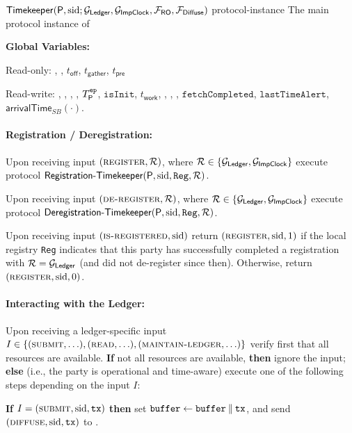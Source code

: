 \begin{cccProtocol}
    {$\mathsf{Timekeeper}(\mathsf{P}, \mathrm{sid}; \mathcal{G}_{\textsf{Ledger}}, \mathcal{G}_{\mathsf{ImpClock}}, \mathcal{F}_{\mathsf{RO}}, \mathcal{F}_{\mathsf{Diffuse}})$}
    {protocol-instance}
    {The main protocol instance of \timekeeper}

    \noindent\textbf{Global Variables:}
    \begin{cccItemize}[nosep]
        \item Read-only: \syncLen, \diffLen, $t_{\mathsf{off}}$, $t_{\mathsf{gather}}$, $t_{\mathsf{pre}}$

        \item Read-write: \localTime, \epoch, \round, \chainLocal, $T^\mathtt{ep}_\mathsf{P}$, $\mathtt{isInit}$, $t_{\mathsf{work}}$, \buffer, \futureChains, \isSync, $\mathtt{fetchCompleted}$, $\mathtt{lastTimeAlert}$, $\mathsf{arrivalTime}_{SB}(\cdot)$.
    \end{cccItemize}

    \paragraph{Registration / Deregistration:}
    \begin{cccItemize}[nosep]
        \item Upon receiving input $(\textsc{register}, \mathcal{R})$, where $\mathcal{R} \in \{ \mathcal{G}_{\textsf{Ledger}}, \mathcal{G}_{\mathsf{ImpClock}} \}$ execute protocol $\textsf{Registration-Timekeeper}(\mathsf{P}, \mathrm{sid}, \mathtt{Reg}, \mathcal{R})$.

        \item Upon receiving input $(\textsc{de-register}, \mathcal{R})$, where $\mathcal{R} \in \{ \mathcal{G}_{\textsf{Ledger}}, \mathcal{G}_{\mathsf{ImpClock}} \}$ execute protocol $\textsf{Deregistration-Timekeeper}(\mathsf{P}, \mathrm{sid}, \mathtt{Reg}, \mathcal{R})$.

        \item Upon receiving input $(\textsc{is-registered}, \mathrm{sid})$ return $(\textsc{register}, \mathrm{sid}, 1)$ if the local registry \texttt{Reg} indicates that this party has successfully completed a registration with $\mathcal{R} = \mathcal{G}_{\textsf{Ledger}}$ (and did not de-register since then).
        Otherwise, return $(\textsc{register}, \mathrm{sid}, 0)$.
    \end{cccItemize}

    \paragraph{Interacting with the Ledger:}
    Upon receiving a ledger-specific input $I \in \{(\textsc{submit}, \ldots),\allowbreak (\textsc{read}, \ldots),(\textsc{maintain-ledger}, \allowbreak \ldots)\}$ verify first that all resources are available.
    \textbf{If} not all resources are available, \textbf{then} ignore the input; \textbf{else} (i.e., the party is operational and time-aware) execute one of the following steps depending on the input $I$:
    \begin{cccItemize}[nosep]
        \item \textbf{If} $I = (\textsc{submit}, \mathrm{sid}, \mathtt{tx})$ \textbf{then} set $\mathtt{buffer} \gets \mathtt{buffer} \mathbin\Vert \mathtt{tx}$, and send $(\textsc{diffuse}, \mathrm{sid}, \mathtt{tx})$ to \funcDiffuse.


\end{cccItemize}
\end{cccProtocol}
